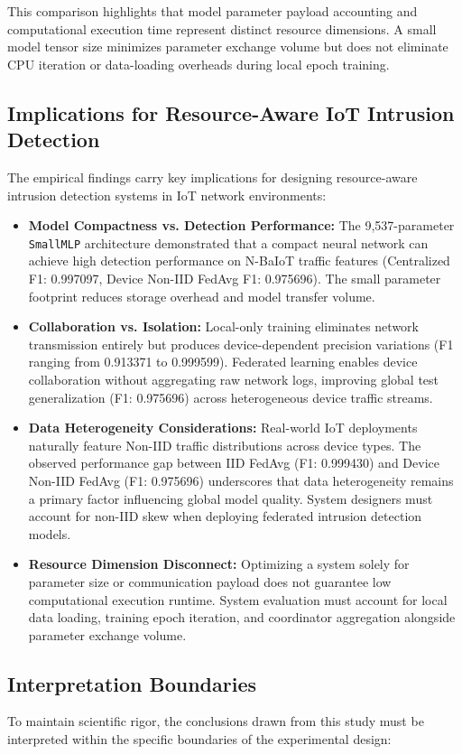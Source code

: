 \documentclass[11pt,a4paper]{article}
\begin{document}
This comparison highlights that model parameter payload accounting and computational execution time represent distinct resource dimensions. A small model tensor size minimizes parameter exchange volume but does not eliminate CPU iteration or data-loading overheads during local epoch training.

\subsection{Implications for Resource-Aware IoT Intrusion Detection}
The empirical findings carry key implications for designing resource-aware intrusion detection systems in IoT network environments:

\begin{itemize}
    \item \textbf{Model Compactness vs. Detection Performance:} The 9,537-parameter \texttt{SmallMLP} architecture demonstrated that a compact neural network can achieve high detection performance on N-BaIoT traffic features (Centralized F1: 0.997097, Device Non-IID FedAvg F1: 0.975696). The small parameter footprint reduces storage overhead and model transfer volume.
    \item \textbf{Collaboration vs. Isolation:} Local-only training eliminates network transmission entirely but produces device-dependent precision variations (F1 ranging from 0.913371 to 0.999599). Federated learning enables device collaboration without aggregating raw network logs, improving global test generalization (F1: 0.975696) across heterogeneous device traffic streams.
    \item \textbf{Data Heterogeneity Considerations:} Real-world IoT deployments naturally feature Non-IID traffic distributions across device types. The observed performance gap between IID FedAvg (F1: 0.999430) and Device Non-IID FedAvg (F1: 0.975696) underscores that data heterogeneity remains a primary factor influencing global model quality. System designers must account for non-IID skew when deploying federated intrusion detection models.
    \item \textbf{Resource Dimension Disconnect:} Optimizing a system solely for parameter size or communication payload does not guarantee low computational execution runtime. System evaluation must account for local data loading, training epoch iteration, and coordinator aggregation alongside parameter exchange volume.
\end{itemize}

\subsection{Interpretation Boundaries}
To maintain scientific rigor, the conclusions drawn from this study must be interpreted within the specific boundaries of the experimental design:
\end{document}
